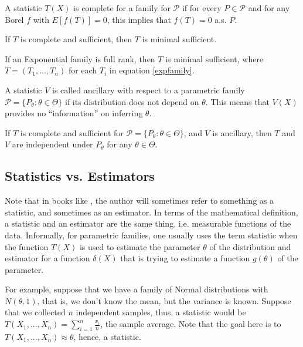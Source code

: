 \begin{definition}[Completeness]
	A statistic $T(X)$ is complete for a family for $\mathcal P$ if
	for every $P \in \mathcal P$ and for any Borel $f$ with $E[f(T)] = 0$, this
	implies that $f(T) = 0$ a.s. $P$.
\end{definition}

\begin{theorem}
	If $T$ is complete and sufficient, then $T$ is minimal sufficient.
\end{theorem}

\begin{theorem}
	If an Exponential family is full rank, then $T$ is minimal sufficient, where
	$T = (T_1,...,T_n)$ for each $T_i$ in equation \eqref{expfamily}.
\end{theorem}

\begin{definition}[Ancillary]
	A statistic $V$ is called ancillary with respect to a parametric
	family
	$\mathcal P=\{P_\theta: \theta \in \Theta\}$ if its distribution does not depend on
	$\theta$. This means that $V(X)$ provides no ``information'' on inferring $\theta$.
\end{definition}

\begin{theorem}[Basu]
	If $T$ is complete and sufficient for
	$\mathcal P=\{P_\theta: \theta \in \Theta\}$, and $V$ is ancillary, then
	$T$ and $V$ are independent under $P_\theta$ for any $\theta \in \Theta$.
\end{theorem}

\subsection{Statistics vs. Estimators}

Note that in books like \citet{keener2010theoretical}, the author will sometimes
refer to something as a statistic, and sometimes as an estimator.
In terms of the mathematical definition, a statistic and an estimator
are the same thing, i.e. measurable functions of the data. Informally,
for parametric families,
one usually uses the term statistic when the function $T(X)$ is used
to estimate the parameter $\theta$ of the distribution and estimator for a function
$\delta(X)$ that is trying to estimate a function $g(\theta)$ of the parameter.

For example, suppose that we have a family of Normal distributions with
$N(\theta,1)$, that is, we don't know the mean, but the variance is known.
Suppose that we collected $n$ independent samples, thus, a
statistic would be $T(X_1,...,X_n) = \sum^n_{i=1}\frac{x_i}{n}$, the sample average.
Note that the goal here is to $T(X_1,...,X_n)\approx \theta$, hence, a statistic.

